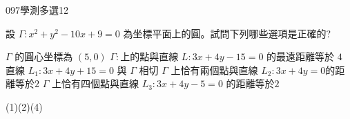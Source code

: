 \begin{QUESTIONS}
\begin{QUESTION}
\begin{QEMPTYSPACE}
        \end{QEMPTYSPACE}
    \end{QUESTION}
    \begin{QUESTION}
        \begin{ExamInfo}{097}{學測}{多選}{12}
        \end{ExamInfo}
        \begin{ExamAnsRateInfo}{34}{62}{29}{11}
        \end{ExamAnsRateInfo}
        \begin{QBODY}
			設 $\Gamma : x^2 + y^2 - 10x + 9 = 0$ 為坐標平面上的圓。試問下列哪些選項是正確的? 
			\begin{QOPS} 
				\QOP $\Gamma$ 的圓心坐標為 $(5,0)$ 
				\QOP $\Gamma:$上的點與直線 $L: 3x+4y-15=0$ 的最遠距離等於 $4 $
				\QOP 直線 $L_1 :3x+4y+15=0$ 與 $\Gamma$ 相切    
                \QOP $\Gamma$ 上恰有兩個點與直線 $L_2 :3x+4y=0 $的距離等於$2$ 
				\QOP $\Gamma$ 上恰有四個點與直線 $L_3 :3x+4y - 5=0$ 的距離等於$2$
			\end{QOPS}
        \end{QBODY}
        \begin{QFROMS}
        \end{QFROMS}
        \begin{QTAGS}\end{QTAGS}
        \begin{QANS}
            (1)(2)(4)
        \end{QANS}
        \begin{QSOLLIST}
        \end{QSOLLIST}
        \begin{QEMPTYSPACE}
        \end{QEMPTYSPACE}
    \end{QUESTION}
\end{QUESTIONS}

